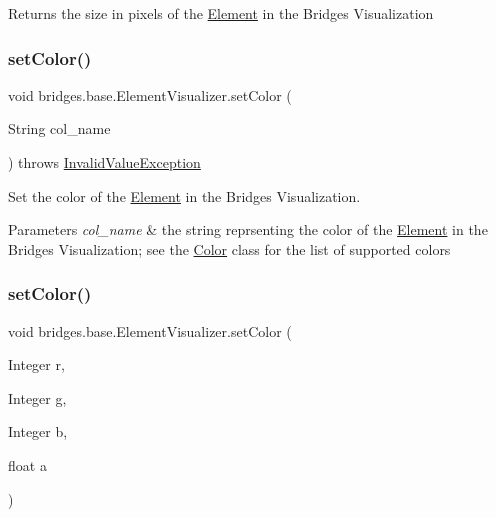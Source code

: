 \begin{DoxyReturn}{Returns}
the size in pixels of the \mbox{\hyperlink{classbridges_1_1base_1_1_element}{Element}} in the Bridges Visualization 
\end{DoxyReturn}
\mbox{\label{classbridges_1_1base_1_1_element_visualizer_ad7ff2a772741301c08943a58ffccca38}} 
\subsubsection{\texorpdfstring{set\+Color()}{setColor()}\hspace{0.1cm}{\footnotesize\ttfamily [1/3]}}
{\footnotesize\ttfamily void bridges.\+base.\+Element\+Visualizer.\+set\+Color (\begin{DoxyParamCaption}\item[{String}]{col\+\_\+name }\end{DoxyParamCaption}) throws \mbox{\hyperlink{classbridges_1_1validation_1_1_invalid_value_exception}{Invalid\+Value\+Exception}}}



Set the color of the \mbox{\hyperlink{classbridges_1_1base_1_1_element}{Element}} in the Bridges Visualization. 


\begin{DoxyParams}{Parameters}
{\em col\+\_\+name} & the string reprsenting the color of the \mbox{\hyperlink{classbridges_1_1base_1_1_element}{Element}} in the Bridges Visualization; see the \mbox{\hyperlink{classbridges_1_1base_1_1_color}{Color}} class for the list of supported colors \\
\hline
\end{DoxyParams}
\mbox{\label{classbridges_1_1base_1_1_element_visualizer_a84fad1c8abe43b20c68c1800d7630918}} 
\subsubsection{\texorpdfstring{set\+Color()}{setColor()}\hspace{0.1cm}{\footnotesize\ttfamily [2/3]}}
{\footnotesize\ttfamily void bridges.\+base.\+Element\+Visualizer.\+set\+Color (\begin{DoxyParamCaption}\item[{Integer}]{r,  }\item[{Integer}]{g,  }\item[{Integer}]{b,  }\item[{float}]{a }\end{DoxyParamCaption})}



